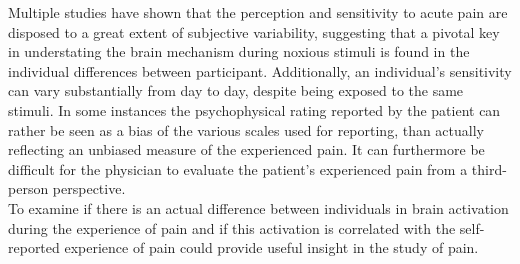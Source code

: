 Multiple studies \cite{Davis2017,Coghill2003,Kim2004,Emerson2014} have shown that the perception and sensitivity to acute pain are disposed to a great extent of subjective variability, suggesting that a pivotal key in understating the brain mechanism during noxious stimuli is found in the individual differences between participant. Additionally, an individual's sensitivity can vary substantially from day to day, despite being exposed to the same stimuli. In some instances the psychophysical rating reported by the patient can rather be seen as a bias of the various scales used for reporting, than actually reflecting an unbiased measure of the experienced pain. It can furthermore be difficult for the physician to evaluate the patient's experienced pain from a third-person perspective. \cite{Coghill2003} \\
To examine if there is an actual difference between individuals in brain activation during the experience of pain and if this activation is correlated with the self-reported experience of pain could provide useful insight in the study of pain. 